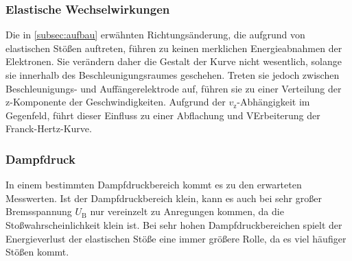 \subsubsection{Elastische Wechselwirkungen}

Die in \autoref{subsec:aufbau} erwähnten Richtungsänderung, die aufgrund von elastischen Stößen auftreten,
führen zu keinen merklichen Energieabnahmen der Elektronen. 
Sie verändern daher die Gestalt der Kurve nicht wesentlich, solange sie innerhalb des Beschleunigungsraumes geschehen.
Treten sie jedoch zwischen Beschleunigungs- und Auffängerelektrode auf, führen sie zu einer Verteilung der z-Komponente der Geschwindigkeiten.
Aufgrund der $v_\text{z}$-Abhängigkeit im Gegenfeld, führt dieser Einfluss zu einer Abflachung und VErbeiterung der Franck-Hertz-Kurve.


\subsubsection{Dampfdruck}

In einem bestimmten Dampfdruckbereich kommt es zu den erwarteten Messwerten. 
Ist der Dampfdruckbereich klein, kann es auch bei sehr großer Bremsspannung $U_\text{B}$ nur vereinzelt zu Anregungen kommen, 
da die Stoßwahrscheinlichkeit klein ist. 
Bei sehr hohen Dampfdruckbereichen spielt der Energieverlust der elastischen Stöße eine immer größere Rolle, 
da es viel häufiger Stößen kommt.
